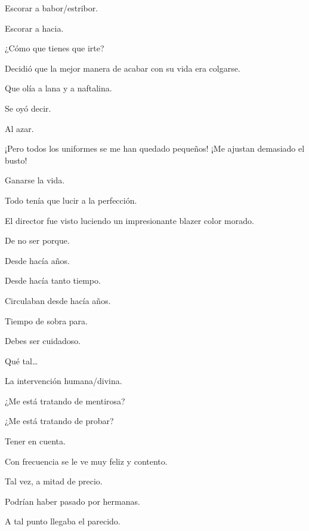 \sk
Escorar a babor/estribor. 

\sk
Escorar a hacia. 

\sk
¿Cómo que tienes que irte? 

\sk
Decidió que la mejor manera de acabar con su vida era colgarse. \nb{}

\sk
Que olía a lana y a naftalina. 

\sk
Se oyó decir. 

\sk
Al azar. 

\sk
¡Pero todos los uniformes se me han quedado pequeños! ¡Me ajustan demasiado el busto!\nb{}

\sk
Ganarse la vida. 

\sk
Todo tenía que lucir a la perfección. \nb{}

\sk
El director fue visto luciendo un impresionante blazer color morado. 

\sk
De no ser porque. 

\sk
Desde hacía años. 

\sk
Desde hacía tanto tiempo. 

\sk
Circulaban desde hacía años. 

\sk
Tiempo de sobra para. 

\sk
Debes ser cuidadoso. 

\sk
Qué tal\ldots{} 

\sk
La intervención humana/divina.\nb{}

\sk
¿Me está tratando de mentirosa? 

\sk
¿Me está tratando de probar? 

\sk
Tener en cuenta. 

\sk
Con frecuencia se le ve muy feliz y contento. 

\sk
Tal vez, a mitad de precio. 

\sk
Podrían haber pasado por hermanas. 

\sk
A tal punto llegaba el parecido. 

